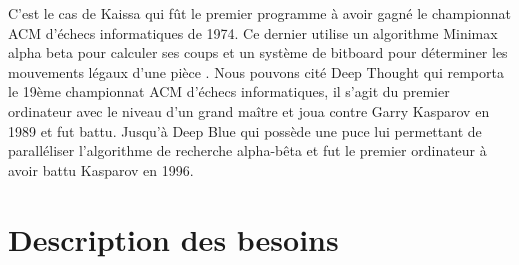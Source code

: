\documentclass{article}
\begin{document}
\newline
C'est le cas de Kaissa qui fût le premier programme à avoir gagné le championnat ACM d'échecs informatiques de 1974. Ce dernier utilise un algorithme Minimax alpha beta \cite{KaissaAB} pour calculer ses coups et un système de bitboard pour déterminer les mouvements légaux d'une pièce \cite{KaissaBitboard}.
\newline
Nous pouvons cité Deep Thought qui remporta le 19ème championnat ACM d'échecs informatiques, il s'agit du premier ordinateur avec le niveau d'un grand maître et joua contre Garry Kasparov en 1989 et fut battu\cite{Deep}. 
\newline
Jusqu'à Deep Blue qui possède une puce lui permettant de paralléliser l'algorithme de recherche alpha-bêta\cite{DeepSystem} et fut le premier ordinateur à avoir battu Kasparov en 1996\cite{Deep}.
\newpage
\section{Description des besoins}

\end{document}
